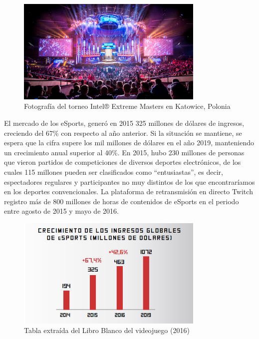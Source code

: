 \begin{figure}[h]
    \centering
    \includegraphics[width=0.8\textwidth]{images/estadodelarte/mercado/foto-torneo-esport}
    \caption{Fotografía del torneo Intel® Extreme Masters en Katowice, Polonia}
\end{figure}

El mercado de los eSports, generó en 2015 325 millones de dólares de ingresos, creciendo del 67\% con respecto al año anterior. Si la situación se mantiene, se espera que la cifra supere los mil millones de dólares en el año 2019, manteniendo un crecimiento anual superior al 40\%. En 2015, hubo 230 millones de personas que vieron partidos de competiciones de diversos deportes electrónicos, de los cuales 115 millones pueden ser clasificados como “entusiastas”, es decir, espectadores regulares y participantes no muy distintos de los que encontraríamos en los deportes convencionales. La plataforma de retransmisión en directo Twitch registro más de 800 millones de horas de contenidos de eSports en el periodo entre agosto de 2015 y mayo de 2016.

\begin{figure}[h]
    \centering
    \includegraphics[width=0.8\textwidth]{images/estadodelarte/mercado/esport-crecimiento-ingreso}
    \caption{Tabla extraída del Libro Blanco del videojuego (2016)}
\end{figure}

